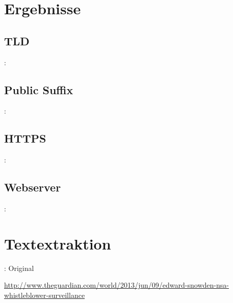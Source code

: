 \documentclass[12pt, utf8, ngerman]{beamer}
\begin{document}
\section{Ergebnisse}

\subsection{TLD}
\begin{frame}{\insertsection: \insertsubsection}
\end{frame}

\subsection{Public Suffix}
\begin{frame}{\insertsection: \insertsubsection}
\end{frame}

\subsection{HTTPS}
\begin{frame}{\insertsection: \insertsubsection}
\end{frame}

\subsection{Webserver}
\begin{frame}{\insertsection: \insertsubsection}
\end{frame}


\section{Textextraktion}

\begin{frame}{\insertsection: Original}

    \scriptsize
    \vspace{.1cm}
    \url{http://www.theguardian.com/world/2013/jun/09/edward-snowden-nsa-whistleblower-surveillance}
\end{frame}
\end{document}
